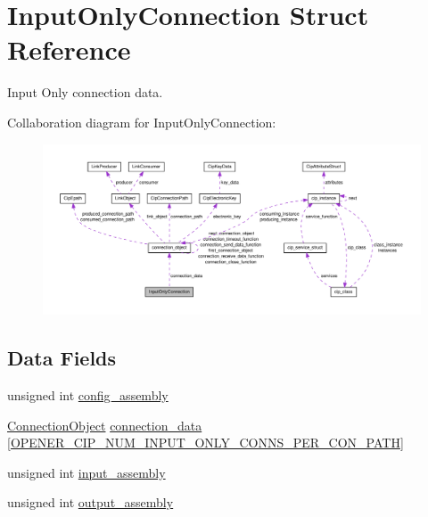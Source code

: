 \hypertarget{structInputOnlyConnection}{\section{\-Input\-Only\-Connection \-Struct \-Reference}
\label{d7/dd8/structInputOnlyConnection}
}


\-Input \-Only connection data.  




\-Collaboration diagram for \-Input\-Only\-Connection\-:
\nopagebreak
\begin{figure}[H]
\begin{center}
\leavevmode
\includegraphics[width=350pt]{d0/d5f/structInputOnlyConnection__coll__graph}
\end{center}
\end{figure}
\subsection*{\-Data \-Fields}
\begin{DoxyCompactItemize}
\item 
unsigned int \hyperlink{structInputOnlyConnection_af1b6da3ad66d0252f1a10ce60e33677c}{config\-\_\-assembly}
\item 
\hyperlink{cipconnectionmanager_8h_a705e78f4613ecabcb6388951b73c4700}{\-Connection\-Object} \hyperlink{structInputOnlyConnection_a5aa38639477c644ea7260b429e1c2510}{connection\-\_\-data} \mbox{[}\hyperlink{WIN32_2sample__application_2opener__user__conf_8h_ac3664613466dea71c92c8599e8ff4d6e}{\-O\-P\-E\-N\-E\-R\-\_\-\-C\-I\-P\-\_\-\-N\-U\-M\-\_\-\-I\-N\-P\-U\-T\-\_\-\-O\-N\-L\-Y\-\_\-\-C\-O\-N\-N\-S\-\_\-\-P\-E\-R\-\_\-\-C\-O\-N\-\_\-\-P\-A\-T\-H}\mbox{]}
\item 
unsigned int \hyperlink{structInputOnlyConnection_ac507a28eae5d0a06c202480d2629a9bb}{input\-\_\-assembly}
\item 
unsigned int \hyperlink{structInputOnlyConnection_aa725637dd2ea13938840d84d2e449f7a}{output\-\_\-assembly}
\end{DoxyCompactItemize}


